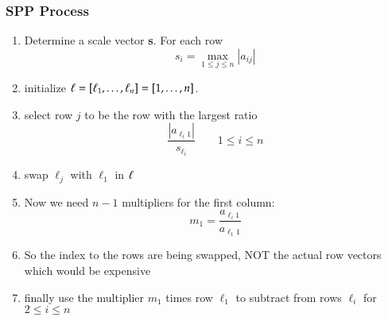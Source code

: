 \documentclass[10pt]{beamer}
\begin{document}
\begin{frame}
\frametitle{SPP Process}
  \begin{enumerate}
    \item Determine a scale vector {\bf{s}}.  For each row
\begin{equation*}
  s_i = \max_{1\leq j \leq n} |a_{ij}|
\end{equation*}

  \item initialize ${\bf{\ell}} = [\ell_1,\dots,\ell_n] = [1,\dots,n]$.
  \item select row $j$ to be the row with the largest ratio
  \begin{equation*}
    \frac{|a_{\ell_i1}|}{s_{\ell_i}}\qquad 1\leq i\leq n
\end{equation*}

  \item swap $\ell_{j}$ with $\ell_{1}$ in ${\bf{\ell}}$

  \item Now we need $n-1$ multipliers for the first column:
  \begin{equation*}
    m_1 = \frac{a_{\ell_{i}1}}{a_{\ell_{1}1}}
\end{equation*}

  \item So the index to the rows are being swapped, NOT the actual row
vectors which would be expensive

  \item finally use the multiplier $m_1$ times row $\ell_1$ to subtract
from rows $\ell_i$ for $2 \leq i \leq n$
\end{enumerate}
\end{frame}
\end{document}
